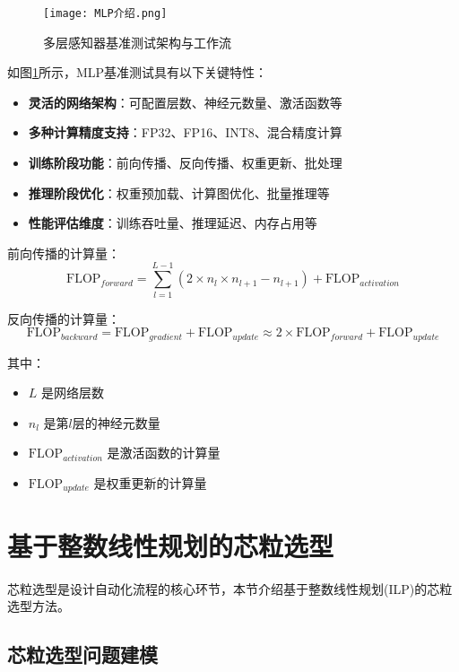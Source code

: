 \documentclass[bachelor]{thesis-uestc}
\begin{document}
\begin{figure}[htbp]
    \centering
    \texttt{[image: MLP介绍.png]}
    \caption{多层感知器基准测试架构与工作流}
    \label{fig:mlp_benchmark}
\end{figure}

如图\ref{fig:mlp_benchmark}所示，MLP基准测试具有以下关键特性：

\begin{itemize}
    \item \textbf{灵活的网络架构}：可配置层数、神经元数量、激活函数等
    \item \textbf{多种计算精度支持}：FP32、FP16、INT8、混合精度计算
    \item \textbf{训练阶段功能}：前向传播、反向传播、权重更新、批处理
    \item \textbf{推理阶段优化}：权重预加载、计算图优化、批量推理等
    \item \textbf{性能评估维度}：训练吞吐量、推理延迟、内存占用等
\end{itemize}

前向传播的计算量：
\begin{equation}
\text{FLOP}_{forward} = \sum_{l=1}^{L-1} (2 \times n_l \times n_{l+1} - n_{l+1}) + \text{FLOP}_{activation}
\end{equation}

反向传播的计算量：
\begin{equation}
\text{FLOP}_{backward} = \text{FLOP}_{gradient} + \text{FLOP}_{update} \approx 2 \times \text{FLOP}_{forward} + \text{FLOP}_{update}
\end{equation}

其中：
\begin{itemize}
    \item $L$ 是网络层数
    \item $n_l$ 是第$l$层的神经元数量
    \item $\text{FLOP}_{activation}$ 是激活函数的计算量
    \item $\text{FLOP}_{update}$ 是权重更新的计算量
\end{itemize}

\section{基于整数线性规划的芯粒选型}

芯粒选型是设计自动化流程的核心环节，本节介绍基于整数线性规划(ILP)的芯粒选型方法。

\subsection{芯粒选型问题建模}
\end{document}
